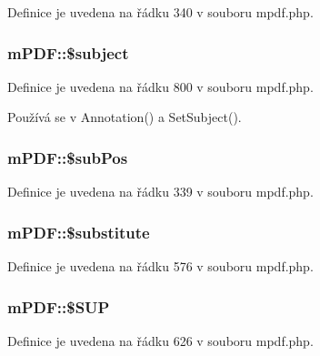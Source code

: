 Definice je uvedena na řádku 340 v souboru mpdf.\-php.

\hypertarget{classm_p_d_f_acaa4e9105b8adfeec3c522efb36546e7}{
\subsubsection[{\$subject}]{\setlength{\rightskip}{0pt plus 5cm}m\-P\-D\-F\-::\$subject}}\label{classm_p_d_f_acaa4e9105b8adfeec3c522efb36546e7}


Definice je uvedena na řádku 800 v souboru mpdf.\-php.



Používá se v Annotation() a Set\-Subject().

\hypertarget{classm_p_d_f_a6503b48d73846b559ef730caa3fdca5b}{
\subsubsection[{\$sub\-Pos}]{\setlength{\rightskip}{0pt plus 5cm}m\-P\-D\-F\-::\$sub\-Pos}}\label{classm_p_d_f_a6503b48d73846b559ef730caa3fdca5b}


Definice je uvedena na řádku 339 v souboru mpdf.\-php.

\hypertarget{classm_p_d_f_a789074c2445c7038cec974aee6edf46f}{
\subsubsection[{\$substitute}]{\setlength{\rightskip}{0pt plus 5cm}m\-P\-D\-F\-::\$substitute}}\label{classm_p_d_f_a789074c2445c7038cec974aee6edf46f}


Definice je uvedena na řádku 576 v souboru mpdf.\-php.

\hypertarget{classm_p_d_f_acd3bea7a4a34d9da01a427567aef7ba6}{
\subsubsection[{\$\-S\-U\-P}]{\setlength{\rightskip}{0pt plus 5cm}m\-P\-D\-F\-::\$\-S\-U\-P}}\label{classm_p_d_f_acd3bea7a4a34d9da01a427567aef7ba6}


Definice je uvedena na řádku 626 v souboru mpdf.\-php.



